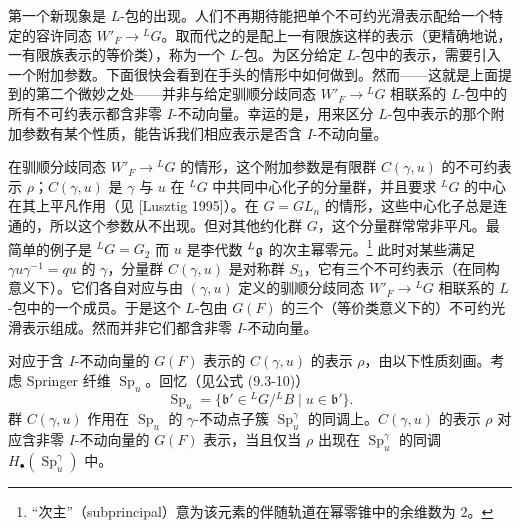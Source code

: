 第一个新现象是 $L$-包的出现。人们不再期待能把单个不可约光滑表示配给一个特定的容许同态 $W'_F\to{}^L G$。取而代之的是配上一有限族这样的表示（更精确地说，一有限族表示的等价类），称为一个 $L$-包。为区分给定 $L$-包中的表示，需要引入一个附加参数。下面很快会看到在手头的情形中如何做到。然而——这就是上面提到的第二个微妙之处——并非与给定驯顺分歧同态 $W'_F\to{}^L G$ 相联系的 $L$-包中的所有不可约表示都含非零 $I$-不动向量。幸运的是，用来区分 $L$-包中表示的那个附加参数有某个性质，能告诉我们相应表示是否含 $I$-不动向量。

在驯顺分歧同态 $W'_F\to{}^L G$ 的情形，这个附加参数是有限群 $C(\gamma,u)$ 的不可约表示 $\rho$；$C(\gamma,u)$ 是 $\gamma$ 与 $u$ 在 ${}^L G$ 中共同中心化子的分量群，并且要求 ${}^L G$ 的中心在其上平凡作用（见 [Lusztig 1995]）。在 $G=GL_n$ 的情形，这些中心化子总是连通的，所以这个参数从不出现。但对其他约化群 $G$，这个分量群常常非平凡。最简单的例子是 ${}^L G=G_2$ 而 $u$ 是李代数 ${}^L\mathfrak{g}$ 的次主幂零元。\footnote{“次主”（subprincipal）意为该元素的伴随轨道在幂零锥中的余维数为 $2$。} 此时对某些满足 $\gamma u\gamma^{-1}=qu$ 的 $\gamma$，分量群 $C(\gamma,u)$ 是对称群 $S_3$，它有三个不可约表示（在同构意义下）。它们各自对应与由 $(\gamma,u)$ 定义的驯顺分歧同态 $W'_F\to{}^L G$ 相联系的 $L$-包中的一个成员。于是这个 $L$-包由 $G(F)$ 的三个（等价类意义下的）不可约光滑表示组成。然而并非它们都含非零 $I$-不动向量。

对应于含 $I$-不动向量的 $G(F)$ 表示的 $C(\gamma,u)$ 的表示 $\rho$，由以下性质刻画。考虑 Springer 纤维 $\operatorname{Sp}_u$。回忆（见公式 (9.3-10)）
\begin{equation}
    \operatorname{Sp}_u=\{\mathfrak{b}'\in{}^L G/{}^L B\mid u\in\mathfrak{b}'\}.
    \tag{10.4-5}
\end{equation}
群 $C(\gamma,u)$ 作用在 $\operatorname{Sp}_u$ 的 $\gamma$-不动点子簇 $\operatorname{Sp}_u^\gamma$ 的同调上。$C(\gamma,u)$ 的表示 $\rho$ 对应含非零 $I$-不动向量的 $G(F)$ 表示，当且仅当 $\rho$ 出现在 $\operatorname{Sp}_u^\gamma$ 的同调 $H_\bullet(\operatorname{Sp}_u^\gamma)$ 中。


